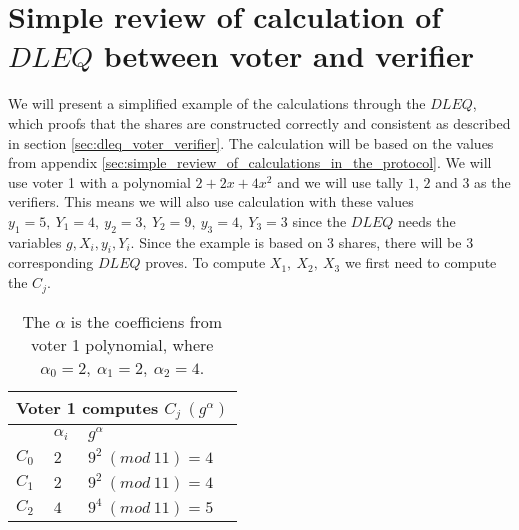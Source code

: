 \section{Simple review of calculation of $DLEQ$ between voter and verifier}
\label{sec:simple_review_of_calculation_of_dleq_between_voter_and_verifier}
We will present a simplified example of the calculations through the $DLEQ$, which proofs that the shares are constructed correctly and consistent as described in section \ref{sec:dleq_voter_verifier}.  The calculation will be based on the values  from appendix \ref{sec:simple_review_of_calculations_in_the_protocol}. We will use voter 1 with a polynomial $2+2x+4x^2$ and we will use tally $1$, $2$ and $3$ as the verifiers. This means we will also  use calculation with these values $y_1 = 5, \ Y_1= 4, \ y_2 = 3, \ Y_2= 9, \ y_3 = 4, \ Y_3= 3$ since the $DLEQ$ needs the variables $g,X_i,y_i,Y_i$. Since the example is based on $3$ shares, there will be $3$ corresponding $DLEQ$ proves. To compute $X_1, \ X_2, \ X_3$ we first need to compute the $C_j$.



\begin{table}[H]
\centering
\begin{tabular}{|l|l|l|}
\hline
\multicolumn{3}{|l|}{\textbf{Voter 1 computes $C_j \ (g^{\alpha})$}} \\ \hline
              & $ \alpha_i $        & $g^{ \alpha }$              \\ \hline
$C_0$          & $2$               & $9^2 \ (mod \ 11) = 4$          \\ \hline
$C_1$          & $2$               & $9^2 \ (mod \ 11) = 4$          \\ \hline
$C_2$          & $4$               & $9^4 \ (mod \ 11) = 5$          \\ \hline
\end{tabular}
\caption{The $\alpha$ is the coefficiens from voter 1 polynomial, where $\alpha_0=2, \ \alpha_1= 2, \ \alpha_2= 4$. }
\label{my-label}
\end{table}

